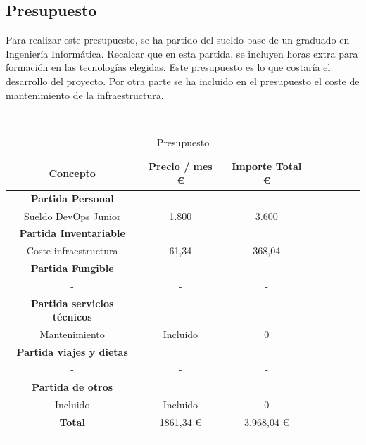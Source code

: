 \subsection{Presupuesto}
\label{presupuesto}
        \begin{text}
            Para realizar este presupuesto, se ha partido del sueldo base de un graduado en Ingeniería Informática. Recalcar que en esta partida, se incluyen horas extra para formación en las tecnologías elegidas. Este presupuesto es lo que costaría el desarrollo del proyecto.
            Por otra parte se ha incluido en el presupuesto el coste de mantenimiento de la infraestructura.
        \end{text}
        \\
        \begin{table}[ht]
                \centering
                \begin{tabular}[!hbt]{SSSSSSSS} \toprule
                        {Concepto} &  {Precio / mes \euro} & {Importe Total \euro} \\ \midrule
                        {\textbf{Partida Personal}} \\ \midrule
                        {Sueldo DevOps Junior}  & {1.800} & {3.600}  \\
                    \midrule
                        {\textbf{Partida Inventariable}} \\ \midrule
                        {Coste infraestructura}  & {61,34}  & {368,04}   \\
                        \midrule
                        {\textbf{Partida Fungible}} \\ \midrule
                        {-}  & {-}  & {-}   \\
                        \midrule
                        {\textbf{Partida servicios técnicos}} \\ \midrule
                        {Mantenimiento}  & {Incluido}  & {0} \\
                        \midrule
                        {\textbf{Partida viajes y dietas}} \\ \midrule
                        {-}  & {-}  & {-} \\
                        \midrule
                        {\textbf{Partida de otros}} \\ \midrule
                        {Incluido}  & {Incluido}  & {0} \\
                        \midrule
                        {\textbf{Total}}  & {1861,34 \euro}  & {3.968,04 \euro} \\
                        \\ \midrule
                 \\ \bottomrule
                \end{tabular}
                \caption[Presupuesto]{Presupuesto \cite{presupuesto:online}} 
                \label{Presupuesto}
        \end{table}


